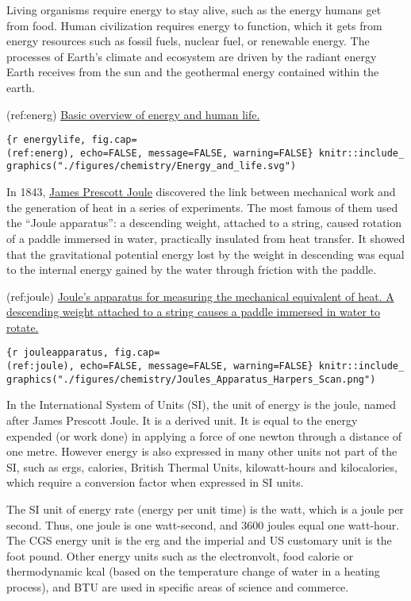 \documentclass[
]{article}
\begin{document}
Living organisms require energy to stay alive, such as the energy humans
get from food. Human civilization requires energy to function, which it
gets from energy resources such as fossil fuels, nuclear fuel, or
renewable energy. The processes of Earth's climate and ecosystem are
driven by the radiant energy Earth receives from the sun and the
geothermal energy contained within the earth.

(ref:energ)
\href{https://commons.wikimedia.org/wiki/File:Energy_and_life.svg}{Basic
overview of energy and human life.}

\texttt{\{r\ energylife,\ fig.cap=\textquotesingle{}(ref:energ)\textquotesingle{},\ echo=FALSE,\ message=FALSE,\ warning=FALSE\}\ knitr::include\_graphics("./figures/chemistry/Energy\_and\_life.svg")}

In 1843, \href{https://en.wikipedia.org/wiki/James_Prescott_Joule}{James
Prescott Joule} discovered the link between mechanical work and the
generation of heat in a series of experiments. The most famous of them
used the ``Joule apparatus'': a descending weight, attached to a string,
caused rotation of a paddle immersed in water, practically insulated
from heat transfer. It showed that the gravitational potential energy
lost by the weight in descending was equal to the internal energy gained
by the water through friction with the paddle.

(ref:joule)
\href{https://commons.wikimedia.org/wiki/File:Joule\%27s_Apparatus_(Harper\%27s_Scan).png}{Joule's
apparatus for measuring the mechanical equivalent of heat. A descending
weight attached to a string causes a paddle immersed in water to
rotate.}

\texttt{\{r\ jouleapparatus,\ fig.cap=\textquotesingle{}(ref:joule)\textquotesingle{},\ echo=FALSE,\ message=FALSE,\ warning=FALSE\}\ knitr::include\_graphics("./figures/chemistry/Joules\_Apparatus\_Harpers\_Scan.png")}

In the International System of Units (SI), the unit of energy is the
joule, named after James Prescott Joule. It is a derived unit. It is
equal to the energy expended (or work done) in applying a force of one
newton through a distance of one metre. However energy is also expressed
in many other units not part of the SI, such as ergs, calories, British
Thermal Units, kilowatt-hours and kilocalories, which require a
conversion factor when expressed in SI units.

The SI unit of energy rate (energy per unit time) is the watt, which is
a joule per second. Thus, one joule is one watt-second, and 3600 joules
equal one watt-hour. The CGS energy unit is the erg and the imperial and
US customary unit is the foot pound. Other energy units such as the
electronvolt, food calorie or thermodynamic kcal (based on the
temperature change of water in a heating process), and BTU are used in
specific areas of science and commerce.
\end{document}
